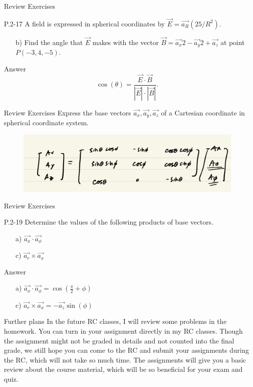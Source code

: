 \documentclass[xcolor={dvipsnames}]{beamer}
\begin{document}
\begin{frame}{Review Exercises}
\begin{block}{P.2-17}
 A field is expressed in spherical coordinates by $\vec{E} = \vec{a_R}(25/R^2)$.
\begin{itemize}
    \item [b)] Find the angle that $\vec{E}$ makes with the vector $\vec{B} = \vec{a_x}2 - \vec{a_y}2 + \vec{a_z}$ at point $P(-3, 4, -5)$.
\end{itemize}
\end{block}
\pause
\begin{block}{Answer}
$$\cos(\theta)=\frac{\vec{E}\cdot\vec{B}}{|\vec{E}|\cdot|\vec{B}|}.$$
\end{block}
\end{frame}
\begin{frame}{Review Exercises}
Express the base vectors $\vec{a_x},\vec{a_y}, \vec{a_z}$ of a Cartesian coordinate in spherical coordinate system.
\pause
\begin{figure}[H]
	\centering
	\includegraphics[width=0.7\linewidth]{2.png}
\end{figure}
\end{frame}
\begin{frame}{Review Exercises}
\begin{block}{P.2-19}
Determine the values of the following products of base vectors.
\begin{itemize}
    \item [a)] $\vec{a_x}\cdot\vec{a_\phi}$
    \item [c)] $\vec{a_r}\times\vec{a_x}$ 
\end{itemize}
\end{block}
\pause
\begin{block}{Answer}
\begin{itemize}
    \item [a)] $\vec{a_x}\cdot\vec{a_\phi}=\cos (\frac{\pi}{2}+\phi)$
    \item [c)] $\vec{a_r}\times\vec{a_x}=-\vec{a_z}\sin (\phi)$ 
\end{itemize}
\end{block}
\end{frame}
\begin{frame}{Further plans}
In the future RC classes, I will review some problems in the homework. You can turn in your assignment directly in my RC classes. Though the assignment might not be graded in details and not counted into the final grade, we still hope you can come to the RC and submit your assignments during the RC, which will not take so much time. The assignments will give you a basic review about the course material, which will be so beneficial for your exam and quiz. 

\end{frame}
\end{document}
